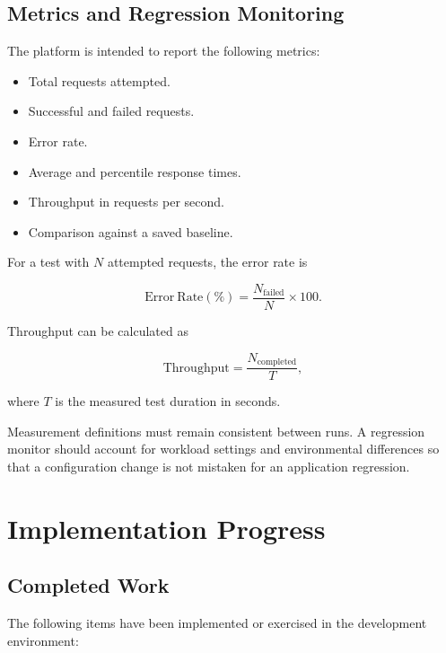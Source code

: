 \documentclass[11pt,a4paper,oneside]{report}
\begin{document}
\section{Metrics and Regression Monitoring}

The platform is intended to report the following metrics:

\begin{itemize}
  \item Total requests attempted.
  \item Successful and failed requests.
  \item Error rate.
  \item Average and percentile response times.
  \item Throughput in requests per second.
  \item Comparison against a saved baseline.
\end{itemize}

For a test with $N$ attempted requests, the error rate is

\[
\mathrm{Error\ Rate}(\%) =
\frac{N_{\mathrm{failed}}}{N}\times 100.
\]

Throughput can be calculated as

\[
\mathrm{Throughput} =
\frac{N_{\mathrm{completed}}}{T},
\]

where $T$ is the measured test duration in seconds.

Measurement definitions must remain consistent between runs.
A regression monitor should account for workload settings and
environmental differences so that a configuration change is
not mistaken for an application regression.

\chapter{Implementation Progress}

\section{Completed Work}

The following items have been implemented or exercised in
the development environment:
\end{document}

